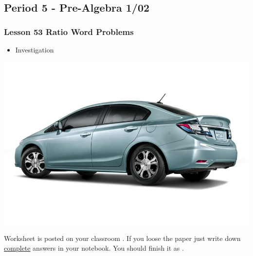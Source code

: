    	 \subsection[PA1/02]{Period 5 - Pre-Algebra 1/02}
   	    \begin{frame}[label=PA1_02]
   	    		\frametitle{Lesson 53 Ratio Word Problems}

        \begin{itemize}
     	    \item {} Investigation
      \end{itemize}
      \vspace{-20pt}
        \begin{center}
\includegraphics[width=0.5\linewidth]{Images/honda_civic}
\end{center}
           \vspace{-20pt}
         \begin{alertblock}{}
         	Worksheet is posted on your  classroom .
         	If you loose the paper just write down \underline{complete} answers in your notebook. You should finish it as .
         \end{alertblock}
   	  \end{frame}

